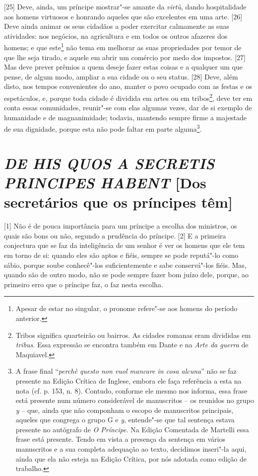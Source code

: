 {[}25{]} Deve, ainda, um príncipe mostrar"-se amante da \emph{virtù},
dando hospitalidade aos homens virtuosos e honrando aqueles que são
excelentes em uma arte. {[}26{]} Deve ainda animar os seus cidadãos a
poder exercitar calmamente as suas atividades: nos negócios, na
agricultura e em todos os outros afazeres dos homens; e que
este\footnote{Apesar de estar no singular, o pronome refere"-se aos
  homens do período anterior.} não tema em melhorar as suas propriedades
por temor de que lhe seja tirado, e aquele em abrir um comércio por medo
dos impostos. {[}27{]} Mas deve prever prêmios a quem deseje fazer estas
coisas e a qualquer um que pense, de algum modo, ampliar a sua cidade ou
o seu status. {[}28{]} Deve, além disto, nos tempos convenientes do ano,
manter o povo ocupado com as festas e os espetáculos, e, porque toda
cidade é dividida em artes ou em tribos\footnote{Tribos significa
  quarteirão ou bairros. As cidades romanas eram divididas em
  \emph{tribus}. Essa expressão se encontra também em Dante e na
  \emph{Arte da guerra} de Maquiavel.}, deve ter em conta essas
comunidades, reunir"-se com elas algumas vezes, dar de si exemplo de
humanidade e de magnanimidade; todavia, mantendo sempre firme a
majestade de sua dignidade, porque esta não pode faltar em parte
alguma\footnote{A frase final ``\emph{perchè questo non vuol mancare in
  cosa alcuna}'' não se faz presente na Edição Crítica
  de Inglese, embora ele faça referência a esta na nota (cf. p. 153, n.
  8). Contudo, conforme ele mesmo nos informa, essa frase está presente
  num número considerável de manuscritos -- os reunidos no grupo
  \emph{y} -- que, ainda que não componham o escopo de manuscritos
  principais, aqueles que congrega o grupo G e \emph{y}, entende"-se que
  tal sentença estava presente no autógrafo de \emph{O Príncipe}. Na
  Edição Comentada de Martelli essa frase está presente. Tendo em vista
  a presença da sentença em vários manuscritos e a sua completa
  adequação ao texto, decidimos inseri"-la aqui, ainda que ela não esteja
  na Edição Crítica, por nós adotada como edição de trabalho.}.

\quebra\section{\emph{DE HIS QUOS A SECRETIS PRINCIPES HABENT}
{[}Dos secretários que os príncipes têm{]}}

{[}1{]} Não é de pouca importância para um príncipe a escolha dos
ministros, os quais são bons ou não, segundo a prudência do príncipe.
{[}2{]} E a primeira conjectura que se faz da inteligência de um senhor
é ver os homens que ele tem em torno de si: quando eles são aptos e
fiéis, sempre se pode reputá"-lo como sábio, porque soube conhecê"-los
suficientemente e sabe conservá"-los fiéis. Mas, quando são de outro
modo, não se pode sempre fazer bom juízo dele, porque, ao primeiro erro
que o príncipe faz, o faz nesta escolha.

